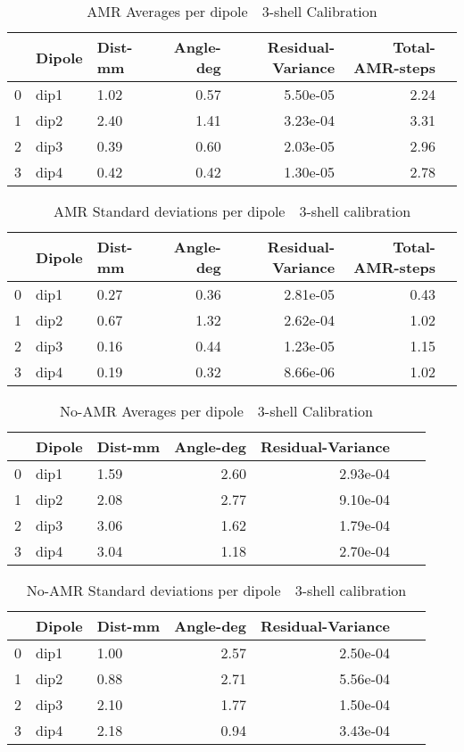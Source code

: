 \documentclass{article}
\begin{document}
\begin{table}
\begin{tabular}{lllrrrr}
\toprule
& Dipole& Dist-mm& Angle-deg& Residual-Variance& Total-AMR-steps\\
\midrule
0 & dip1 & 1.02 & 0.57 & 5.50e-05 & 2.24\\
1 & dip2 & 2.40 & 1.41 & 3.23e-04 & 3.31\\
2 & dip3 & 0.39 & 0.60 & 2.03e-05 & 2.96\\
3 & dip4 & 0.42 & 0.42 & 1.30e-05 & 2.78\\
\end{tabular}
\caption{AMR Averages per dipole\ \textemdash\ 3-shell Calibration}
\end{table}
\begin{table}
\begin{tabular}{lllrrrr}
\toprule
& Dipole& Dist-mm& Angle-deg& Residual-Variance& Total-AMR-steps\\
\midrule
0 & dip1 & 0.27 & 0.36 & 2.81e-05 & 0.43\\
1 & dip2 & 0.67 & 1.32 & 2.62e-04 & 1.02\\
2 & dip3 & 0.16 & 0.44 & 1.23e-05 & 1.15\\
3 & dip4 & 0.19 & 0.32 & 8.66e-06 & 1.02\\
\end{tabular}
\caption{AMR Standard deviations per dipole\ \textemdash\ 3-shell calibration}
\end{table}
\begin{table}
\begin{tabular}{lllrrrr}
\toprule
& Dipole& Dist-mm& Angle-deg& Residual-Variance\\
\midrule
0 & dip1 & 1.59 & 2.60 & 2.93e-04\\
1 & dip2 & 2.08 & 2.77 & 9.10e-04\\
2 & dip3 & 3.06 & 1.62 & 1.79e-04\\
3 & dip4 & 3.04 & 1.18 & 2.70e-04\\
\end{tabular}
\caption{No-AMR Averages per dipole\ \textemdash\ 3-shell Calibration}
\end{table}
\begin{table}
\begin{tabular}{lllrrrr}
\toprule
& Dipole& Dist-mm& Angle-deg& Residual-Variance\\
\midrule
0 & dip1 & 1.00 & 2.57 & 2.50e-04\\
1 & dip2 & 0.88 & 2.71 & 5.56e-04\\
2 & dip3 & 2.10 & 1.77 & 1.50e-04\\
3 & dip4 & 2.18 & 0.94 & 3.43e-04\\
\end{tabular}
\caption{No-AMR Standard deviations per dipole\ \textemdash\ 3-shell calibration}
\end{table}
\end{document}
